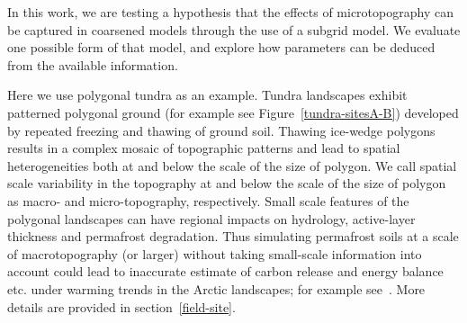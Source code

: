 \documentclass[review,11pt]{elsarticle}
\begin{document}
In this work, we are testing a hypothesis that the effects of microtopography can be captured in coarsened models through the use of a subgrid model. We evaluate one possible form of that model, and explore how parameters can be deduced from the available information.

Here we use polygonal tundra as an example. Tundra landscapes exhibit patterned polygonal ground (for example see Figure~\ref{tundra-sitesA-B}) developed by repeated freezing and thawing of ground soil. Thawing ice-wedge polygons results in a complex mosaic of topographic patterns and lead to spatial heterogeneities both at and below the scale of the size of polygon. We call spatial scale variability in the topography at and below the scale of the size of polygon as macro- and micro-topography, respectively. Small scale features of the polygonal landscapes can have regional impacts on hydrology, active-layer thickness and permafrost degradation. Thus simulating permafrost soils at a scale of macrotopography (or larger) without taking small-scale information into account could lead to inaccurate estimate of carbon release and energy balance etc. under warming trends in the Arctic landscapes; for example see~\cite{liljedahl2016pan,lu2012modeling,andresen2015disappearing,holden2005peatland}. More details are provided in section~\ref{field-site}.
\end{document}
